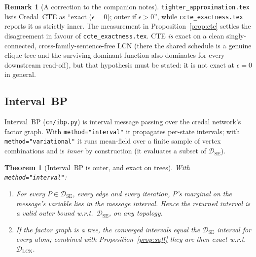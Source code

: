 \documentclass[11pt]{article}
\newtheorem{theorem}{Theorem}
\theoremstyle{definition}
\newtheorem{remark}{Remark}
\newcommand{\DSE}{\mathcal{D}_{\mathrm{SE}}}
\newcommand{\DLCN}{\mathcal{D}_{\mathrm{LCN}}}
\begin{document}
\begin{remark}[A correction to the companion notes]\label{rem:ctecorrection}
\texttt{tighter\_approximation.tex} lists Credal~CTE as ``exact ($\epsilon{=}0$); outer if
$\epsilon>0$'', while \texttt{ccte\_exactness.tex} reports it as strictly inner. The measurement in
Proposition~\ref{prop:cte} settles the disagreement in favour of \texttt{ccte\_exactness.tex}. CTE
\emph{is} exact on a clean singly-connected, cross-family-sentence-free LCN (there the shared schedule
is a genuine clique tree and the surviving dominant function also dominates for every downstream
read-off), but that hypothesis must be stated: it is not exact at $\epsilon{=}0$ in general.
\end{remark}

\subsection{Interval~BP}\label{sec:ibp}
Interval~BP (\texttt{cn/ibp.py}) is interval message passing over the credal network's factor graph.
With \texttt{method="interval"} it propagates per-state intervals; with \texttt{method="variational"}
it runs mean-field over a finite sample of vertex combinations and is \emph{inner} by construction
(it evaluates a subset of $\DSE$).

\begin{theorem}[Interval~BP is outer, and exact on trees]\label{thm:ibp}
With \texttt{method="interval"}:
\begin{enumerate}
  \item[\textup{(i)}] For every $P\in\DSE$, every edge and every iteration, $P$'s marginal on the
    message's variable lies in the message interval. Hence the returned interval is a valid
    \emph{outer} bound w.r.t.\ $\DSE$, on any topology.
  \item[\textup{(ii)}] If the factor graph is a tree, the converged intervals equal the $\DSE$
    interval for every atom; combined with Proposition~\ref{prop:suff} they are then exact w.r.t.\
    $\DLCN$.
\end{enumerate}
\end{theorem}
\end{document}
